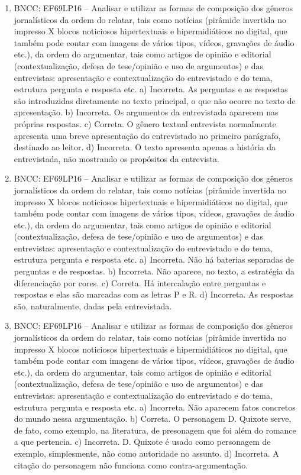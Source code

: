\begin{enumerate}
\item
BNCC: EF69LP16 -- Analisar e utilizar as formas de composição dos
gêneros jornalísticos da ordem do relatar, tais como notícias (pirâmide
invertida no impresso X blocos noticiosos hipertextuais e
hipermidiáticos no digital, que também pode contar com imagens de vários
tipos, vídeos, gravações de áudio etc.), da ordem do argumentar, tais
como artigos de opinião e editorial (contextualização, defesa de
tese/opinião e uso de argumentos) e das entrevistas: apresentação e
contextualização do entrevistado e do tema, estrutura pergunta e
resposta etc. a) Incorreta. As perguntas e as respostas são introduzidas diretamente no texto principal, o que não ocorre no texto de apresentação. b) Incorreta. Os argumentos da entrevistada aparecem nas próprias respostas. c) Correta. O gênero textual entrevista normalmente apresenta uma breve apresentação do entrevistado no primeiro parágrafo, destinado ao leitor. d) Incorreta. O texto apresenta apenas a história da entrevistada, não mostrando os propósitos da entrevista.

\item
BNCC: EF69LP16 -- Analisar e utilizar as formas de composição dos
gêneros jornalísticos da ordem do relatar, tais como notícias (pirâmide
invertida no impresso X blocos noticiosos hipertextuais e
hipermidiáticos no digital, que também pode contar com imagens de vários
tipos, vídeos, gravações de áudio etc.), da ordem do argumentar, tais
como artigos de opinião e editorial (contextualização, defesa de
tese/opinião e uso de argumentos) e das entrevistas: apresentação e
contextualização do entrevistado e do tema, estrutura pergunta e
resposta etc.
 a) Incorreta. Não há baterias separadas de perguntas e de respostas. b) Incorreta. Não aparece, no texto, a estratégia da diferenciação por cores. c) Correta. Há intercalação entre perguntas e respostas e elas são marcadas com as letras P e R. d) Incorreta. As respostas são, naturalmente, dadas pela entrevistada.

\item
BNCC: EF69LP16 -- Analisar e utilizar as formas de composição dos
gêneros jornalísticos da ordem do relatar, tais como notícias (pirâmide
invertida no impresso X blocos noticiosos hipertextuais e
hipermidiáticos no digital, que também pode contar com imagens de vários
tipos, vídeos, gravações de áudio etc.), da ordem do argumentar, tais
como artigos de opinião e editorial (contextualização, defesa de
tese/opinião e uso de argumentos) e das entrevistas: apresentação e
contextualização do entrevistado e do tema, estrutura pergunta e
resposta etc. a) Incorreta. Não aparecem fatos concretos do mundo nessa argumentação. b) Correta. O personagem D. Quixote serve, de fato, como exemplo, na literatura, de presonagem que foi além do romance a que pertencia. c) Incorreta. D. Quixote é usado como personagem de exemplo, simplesmente, não como autoridade no assunto. d) Incorreta. A citação do personagem não funciona como contra-argumentação.


\end{enumerate}
